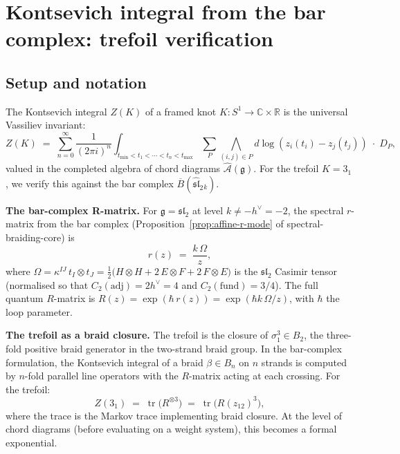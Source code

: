 \documentclass[11pt]{article}
\newcommand{\cA}{\mathcal{A}}
\newcommand{\fg}{\mathfrak{g}}
\newcommand{\fsl}{\mathfrak{sl}}
\newcommand{\barB}{\overline{B}}
\newcommand{\C}{\mathbb{C}}
\newcommand{\R}{\mathbb{R}}
\begin{document}
%
%
%
%

\section{Kontsevich integral from the bar complex: trefoil verification}
\label{sec:trefoil-verification}

\subsection{Setup and notation}

The Kontsevich integral $Z(K)$ of a framed knot $K : S^1 \to
\C \times \R$ is the universal Vassiliev invariant:
\begin{equation}\label{eq:kontsevich-trefoil}
  Z(K)
  \;=\;
  \sum_{n=0}^{\infty}
  \frac{1}{(2\pi i)^n}
  \int_{t_{\min} < t_1 < \cdots < t_n < t_{\max}}
  \sum_P
  \bigwedge_{(i,j) \in P}
  d\log(z_i(t_i) - z_j(t_j))
  \;\cdot\; D_P,
\end{equation}
valued in the completed algebra of chord diagrams
$\widehat{\cA}(\fg)$.  For the trefoil $K = 3_1$, we verify
this against the bar complex $\barB(\widehat{\fsl}_2{}_k)$.

\medskip
\noindent\textbf{The bar-complex R-matrix.}
For $\fg = \mathfrak{sl}_2$ at level $k \neq -h^\vee = -2$,
the spectral $r$-matrix from the bar complex
(Proposition~\ref{prop:affine-r-mode} of
spectral-braiding-core) is
\begin{equation}\label{eq:sl2-r-matrix}
  r(z) \;=\; \frac{k\,\Omega}{z},
\end{equation}
where
$\Omega = \kappa^{IJ}\, t_I \otimes t_J
= \frac{1}{2}\bigl(H \otimes H + 2\,E \otimes F
+ 2\,F \otimes E\bigr)$
is the $\mathfrak{sl}_2$ Casimir tensor
(normalised so that $C_2(\mathrm{adj}) = 2h^\vee = 4$
and $C_2(\mathrm{fund}) = 3/4$).
The full quantum $R$-matrix is
$R(z) = \exp(\hbar\, r(z)) = \exp(\hbar k\,\Omega/z)$,
with $\hbar$ the loop parameter.

\medskip
\noindent\textbf{The trefoil as a braid closure.}
The trefoil is the closure of $\sigma_1^3 \in B_2$, the
three-fold positive braid generator in the two-strand braid
group.  In the bar-complex formulation, the Kontsevich integral
of a braid $\beta \in B_n$ on $n$ strands is computed by
$n$-fold parallel line operators with the $R$-matrix acting at
each crossing.  For the trefoil:
\begin{equation}\label{eq:trefoil-braid}
  Z(3_1)
  \;=\;
  \operatorname{tr}\!\bigl(R^{\otimes 3}\bigr)
  \;=\;
  \operatorname{tr}\!\bigl(R(z_{12})^3\bigr),
\end{equation}
where the trace is the Markov trace implementing braid
closure.  At the level of chord diagrams (before evaluating on
a weight system), this becomes a formal exponential.
\end{document}
